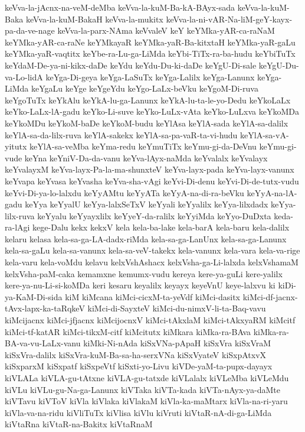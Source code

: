 {keVva-la-jAcnx-na-veM-deMba
keVva-la-kuM-Ba-kA-BAyx-sada
keVva-la-kuM-Baka
keVva-la-kuM-BakaH
keVva-la-mukitx
keVva-la-ni-vAR-Na-liM-geY-kayx-pa-da-ve-nage
keVva-la-parx-NAma
keVvaleV
keY
keYMka-yAR-ca-raNaM
keYMka-yAR-ca-raNe
keYMkayaR
keYMka-yaR-Ba-kitxtaH
keYMka-yaR-gaLu
keYMka-yaR-vaqtitx
keYbe-ra-Lu-ga-LiMda
keYbi-TiTx-ra-ba-hudu
keYbiTuTx
keYdaM-De-ya-ni-kikx-daDe
keYdu
keYdu-Du-ki-daDe
keYgU-Di-sale
keYgU-Du-va-Lo-lidA
keYga-Di-geya
keYga-LaSuTx
keYga-Lalilx
keYga-Lanunx
keYga-LiMda
keYgaLu
keYge
keYgeYdu
keYgo-LaLx-beVku
keYgoM-Di-ruva
keYgoTuTx
keYkAlu
keYkA-lu-ga-Lanunx
keYkA-lu-ta-le-yo-Dedu
keYkoLaLx
keYko-LaLx-lA-gadu
keYko-Li-suve
keYko-LuLx-vAta
keYko-LuLxva
keYkoMDa
keYkoMDu
keYkoM-baDe
keYkoM-budu
keYlAsa
keYlA-sada
keYlA-sa-dalilx
keYlA-sa-da-lilx-ruva
keYlA-sakekx
keYlA-sa-pa-vaR-ta-vi-hudu
keYlA-sa-vA-yitutx
keYlA-sa-veMba
keYma-redu
keYmuTiTx
keYmu-gi-da-DeVnu
keYmu-gi-vude
keYna
keYniV-Da-da-vanu
keYva-lAyx-naMda
keYvalalx
keYvalayx
keYvalayxM
keYva-layx-Pa-la-ma-shunxteV
keYva-layx-pada
keYva-layx-vanunx
keYvapa
keYvasa
keYvasha
keYva-sha-vAgi
keYvi-Di-denu
keYvi-Di-de-tutx-vudu
keYvi-Di-ya-lo-lalxdu
keYyAMtu
keYyATa
keYyA-na-di-ra-beVku
keYyA-na-lA-gadu
keYya
keYyalU
keYya-lalxSeTxV
keYyali
keYyalilx
keYya-lilxdadx
keYya-lilx-ruva
keYyalu
keYyayxlilx
keYyeY-da-ralilx
keYyiMda
keYyo-DuDxta
keda-ra-lAgi
kege-Dalu
kekx
kekxV
kela
kela-ba-lake
kela-barA
kela-baru
kela-dalilx
kelaru
kelasa
kela-sa-ga-LA-dadx-riMda
kela-sa-ga-LanUnx
kela-sa-ga-Lanunx
kela-sa-gaLu
kela-sa-vanunx
kela-sa-veV-takekx
kela-vanunx
kela-vara
kela-va-rige
kela-varu
kela-voMdu
kelavu
kelxVshAshacx
kelxVsha-ga-Li-lalxda
kelxVshamaM
kelxVsha-paM-caka
kemamxne
kemumx-vudu
kereya
kere-ya-guLi
kere-yalilx
kere-ya-nu-Li-si-koMDa
keri
kesaru
keyalilx
keyayx
keyeVnU
keye-lalxvu
ki
kiDi-ya-KaM-Di-sida
kiM
kiMcana
kiMci-cicxM-ta-yeVdf
kiMci-dasitx
kiMci-df-jacnx-tAvx-lapx-ka-taRqkeV
kiMci-di-SayxteV
kiMci-du-nimxV-li-ta-Baq-vavu
kiMcijacnx
kiMci-jfjacnx
kiMcijocnxV
kiMci-tAkxlaM
kiMci-tAkxyaRM
kiMcitf
kiMci-tf-katAR
kiMci-tikxM-citf
kiMcitutx
kiMkara
kiMka-ra-BAva
kiMka-ra-BA-va-vu-LaLx-vanu
kiMki-Ni-nAda
kiSxVNa-pApaH
kiSxVra
kiSxVraM
kiSxVra-dalilx
kiSxVra-kuM-Ba-sa-ha-serxVNa
kiSxVyateV
kiSxpAtxvX
kiSxparxM
kiSxpatf
kiSxpeVtf
kiSxti-yo-Livu
kiVDe-yaM-ta-pupx-dayayx
kiVLALa
kiVLA-gu-tAtxne
kiVLA-gu-tatxde
kiVLalalx
kiVLeMba
kiVLeMdu
kiVLu
kiVLu-gu-Na-ga-Lanunx
kiVTaka
kiVTa-kada
kiVTa-nAyx-ya-daMte
kiVTavu
kiVToV
kiVla
kiVlaka
kiVlakaM
kiVla-ka-maMtarx
kiVla-na-ri-yaru
kiVla-va-na-ridu
kiVliTuTx
kiVlisa
kiVlu
kiVruti
kiVtaR-nA-di-ga-LiMda
kiVtaRna
kiVtaR-na-Bakitx
kiVtaRnaM
}

